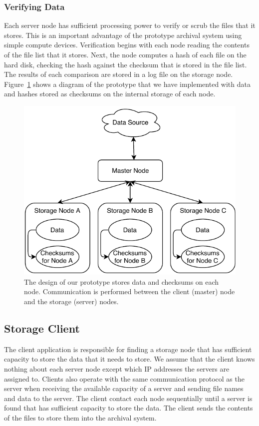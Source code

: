 \subsubsection{Verifying Data}
Each server node has sufficient processing power to verify or scrub the files that it stores.  This is an important advantage of the prototype archival system using simple compute devices.  Verification begins with each node reading the contents of the file list that it stores.  Next, the node computes a hash of each file on the hard disk, checking the hash against the checksum that is stored in the file list.  The results of each comparison are stored in a log file on the storage node.  Figure~\ref{fig3} shows a diagram of the prototype that we have implemented with data and hashes stored as checksums on the internal storage of each node.

\begin{figure}[!ht]
\includegraphics[width=\linewidth]{fig3.pdf}
\caption{The design of our prototype stores data and checksums on each node.  Communication is performed between the client (master) node and the storage (server) nodes.}
\label{fig3}
\end{figure}

\subsection{Storage Client}
The client application is responsible for finding a storage node that has sufficient capacity to store the data that it needs to store.  We assume that the client knows nothing about each server node except which IP addresses the servers are assigned to.  Clients also operate with the same communication protocol as the server when receiving the available capacity of a server and sending file names and data to the server.   The client contact each node sequentially until a server is found that has sufficient capacity to store the data.  The client sends the contents of the files to store them into the archival system.

